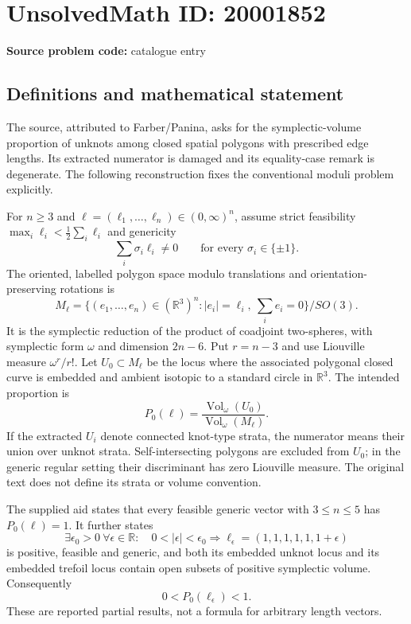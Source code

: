 \documentclass[11pt]{article}
\newcommand{\R}{\mathbb{R}}
\begin{document}
\section*{UnsolvedMath ID: 20001852}
\textbf{Source problem code:} catalogue entry
\subsection{Definitions and mathematical statement}
The source, attributed to Farber/Panina, asks for the symplectic-volume proportion of unknots among closed spatial polygons with prescribed edge lengths. Its extracted numerator is damaged and its equality-case remark is degenerate. The following reconstruction fixes the conventional moduli problem explicitly.

For \(n\geq3\) and \(\ell=(\ell_1,\ldots,\ell_n)\in(0,\infty)^n\), assume strict feasibility \(\max_i\ell_i<\frac12\sum_i\ell_i\) and genericity
\[
 \sum_i\sigma_i\ell_i\ne0\qquad\text{for every }\sigma_i\in\{\pm1\}.
\]
The oriented, labelled polygon space modulo translations and orientation-preserving rotations is
\[
 M_\ell=\{(e_1,\ldots,e_n)\in(\R^3)^n:
 |e_i|=\ell_i,\ \sum_i e_i=0\}/SO(3).
\]
It is the symplectic reduction of the product of coadjoint two-spheres, with symplectic form \(\omega\) and dimension \(2n-6\). Put \(r=n-3\) and use Liouville measure \(\omega^r/r!\). Let \(U_0\subset M_\ell\) be the locus where the associated polygonal closed curve is embedded and ambient isotopic to a standard circle in \(\R^3\). The intended proportion is
\[
 P_0(\ell)=\frac{\operatorname{Vol}_\omega(U_0)}
 {\operatorname{Vol}_\omega(M_\ell)}.
\]
If the extracted \(U_i\) denote connected knot-type strata, the numerator means their union over unknot strata. Self-intersecting polygons are excluded from \(U_0\); in the generic regular setting their discriminant has zero Liouville measure. The original text does not define its strata or volume convention.

The supplied aid states that every feasible generic vector with \(3\leq n\leq5\) has \(P_0(\ell)=1\). It further states
\[
 \exists\epsilon_0>0\ \forall\epsilon\in\R:\quad
 0<|\epsilon|<\epsilon_0\Longrightarrow
 \ell_\epsilon=(1,1,1,1,1,1+\epsilon)
\]
is positive, feasible and generic, and both its embedded unknot locus and its embedded trefoil locus contain open subsets of positive symplectic volume. Consequently
\[
 0<P_0(\ell_\epsilon)<1.
\]
These are reported partial results, not a formula for arbitrary length vectors.
\end{document}
